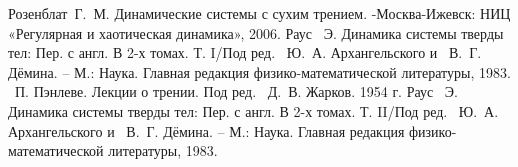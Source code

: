 \documentclass[a4paper]{article}
\begin{document}
\begin{thebibliography}{7}
 Розенблат~Г.~М. Динамические системы с сухим трением. -Москва-Ижевск: НИЦ «Регулярная и хаотическая динамика», 2006.
 Раус ~Э. Динамика системы тверды тел: Пер. с англ. В 2-х томах. Т. I/Под ред. ~Ю.~А. Архангельского и ~В.~Г. Дёмина. – М.: Наука. Главная редакция физико-математической литературы, 1983.
 ~П. Пэнлеве. Лекции о трении. Под ред. ~Д.~В. Жарков. 1954 г.
 Раус ~Э. Динамика системы тверды тел: Пер. с англ. В 2-х томах. Т. II/Под ред. ~Ю.~А. Архангельского и ~В.~Г. Дёмина. – М.: Наука. Главная редакция физико-математической литературы, 1983.
\end{thebibliography}
\end{document}
